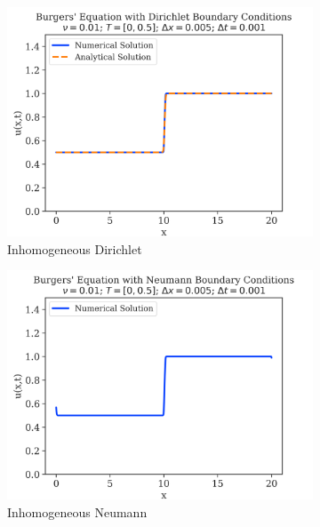 \begin{figure}
	\centering
	\begin{subfigure}{0.55\linewidth}
		\centering
		\includegraphics[width=\linewidth]{../dirichlet_BC/images_nu=0.01/100_plot}
		\caption{Inhomogeneous Dirichlet}
	\end{subfigure}
	\hfill
	\begin{subfigure}{0.55\linewidth}
		\centering
		\includegraphics[width=\linewidth]{../neumann_BC/images_nu=0.01/100_plot}
		\caption{Inhomogeneous Neumann}
	\end{subfigure}
	\hfill
	\begin{subfigure}{0.55\linewidth}
		\centering

\end{subfigure}
\end{figure}
